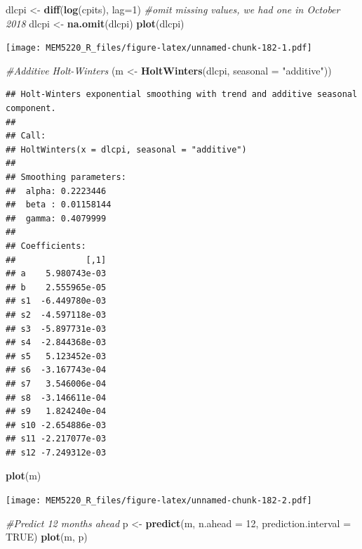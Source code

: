\documentclass[]{book}
\newenvironment{Shaded}{\begin{snugshade}}{\end{snugshade}}
\newcommand{\CommentTok}[1]{\textcolor[rgb]{0.56,0.35,0.01}{\textit{#1}}}
\newcommand{\DataTypeTok}[1]{\textcolor[rgb]{0.13,0.29,0.53}{#1}}
\newcommand{\DecValTok}[1]{\textcolor[rgb]{0.00,0.00,0.81}{#1}}
\newcommand{\KeywordTok}[1]{\textcolor[rgb]{0.13,0.29,0.53}{\textbf{#1}}}
\newcommand{\NormalTok}[1]{#1}
\newcommand{\OtherTok}[1]{\textcolor[rgb]{0.56,0.35,0.01}{#1}}
\newcommand{\StringTok}[1]{\textcolor[rgb]{0.31,0.60,0.02}{#1}}
\begin{document}
\begin{Shaded}
\begin{Highlighting}[]
\NormalTok{dlcpi <-}\StringTok{ }\KeywordTok{diff}\NormalTok{(}\KeywordTok{log}\NormalTok{(cpits), }\DataTypeTok{lag=}\DecValTok{1}\NormalTok{)}
\CommentTok{#omit missing values, we had one in October 2018}
\NormalTok{dlcpi <-}\StringTok{ }\KeywordTok{na.omit}\NormalTok{(dlcpi)}
\KeywordTok{plot}\NormalTok{(dlcpi)}
\end{Highlighting}
\end{Shaded}

\texttt{[image: MEM5220\_R\_files/figure-latex/unnamed-chunk-182-1.pdf]}

\begin{Shaded}
\begin{Highlighting}[]
\CommentTok{#Additive Holt-Winters}
\NormalTok{(m <-}\StringTok{ }\KeywordTok{HoltWinters}\NormalTok{(dlcpi, }\DataTypeTok{seasonal =} \StringTok{"additive"}\NormalTok{))}
\end{Highlighting}
\end{Shaded}

\begin{verbatim}
## Holt-Winters exponential smoothing with trend and additive seasonal component.
## 
## Call:
## HoltWinters(x = dlcpi, seasonal = "additive")
## 
## Smoothing parameters:
##  alpha: 0.2223446
##  beta : 0.01158144
##  gamma: 0.4079999
## 
## Coefficients:
##              [,1]
## a    5.980743e-03
## b    2.555965e-05
## s1  -6.449780e-03
## s2  -4.597118e-03
## s3  -5.897731e-03
## s4  -2.844368e-03
## s5   5.123452e-03
## s6  -3.167743e-04
## s7   3.546006e-04
## s8  -3.146611e-04
## s9   1.824240e-04
## s10 -2.654886e-03
## s11 -2.217077e-03
## s12 -7.249312e-03
\end{verbatim}

\begin{Shaded}
\begin{Highlighting}[]
\KeywordTok{plot}\NormalTok{(m)}
\end{Highlighting}
\end{Shaded}

\texttt{[image: MEM5220\_R\_files/figure-latex/unnamed-chunk-182-2.pdf]}

\begin{Shaded}
\begin{Highlighting}[]
\CommentTok{#Predict 12 months ahead}
\NormalTok{p <-}\StringTok{ }\KeywordTok{predict}\NormalTok{(m, }\DataTypeTok{n.ahead =} \DecValTok{12}\NormalTok{, }\DataTypeTok{prediction.interval =} \OtherTok{TRUE}\NormalTok{)}
\KeywordTok{plot}\NormalTok{(m, p)}
\end{Highlighting}
\end{Shaded}
\end{document}
